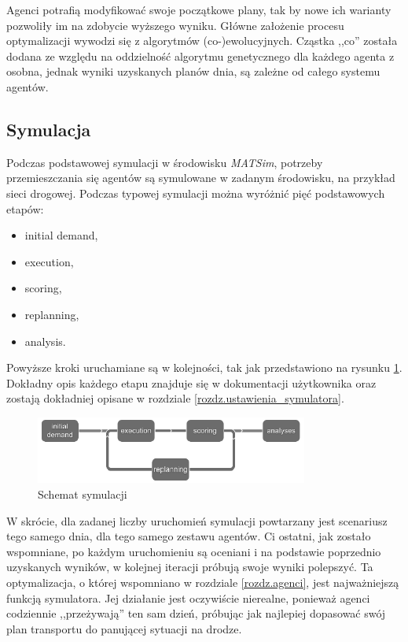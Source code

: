 \documentclass[twoside,12pt]{report}
\begin{document}
Agenci potrafią modyfikować swoje początkowe plany, tak by nowe ich warianty pozwoliły im na zdobycie wyższego wyniku. Główne założenie procesu optymalizacji wywodzi się z algorytmów (co-)ewolucyjnych. Cząstka ,,co'' została dodana ze względu na oddzielność algorytmu genetycznego dla każdego agenta z osobna, jednak wyniki uzyskanych planów dnia, są zależne od całego systemu agentów. 

\subsection{Symulacja}

Podczas podstawowej symulacji w środowisku \textit{MATSim}, potrzeby przemieszczania się agentów są symulowane w zadanym środowisku, na przykład sieci drogowej. Podczas typowej symulacji można wyróżnić pięć podstawowych etapów:

\begin{itemize}
\item initial demand,
\item execution,
\item scoring,
\item replanning,
\item analysis.
\end{itemize}

Powyższe kroki uruchamiane są w kolejności, tak jak przedstawiono na rysunku \ref{fig:schemat_symulacji}. Dokładny opis każdego etapu znajduje się w dokumentacji użytkownika \cite{matsim userg} oraz zostają dokładniej opisane w rozdziale \ref{rozdz.ustawienia_symulatora}.

\begin{figure}[ht]
	\centering
	\includegraphics[width=0.8\textwidth]{img/simulation_stages}
	\caption{Schemat symulacji}
	\label{fig:schemat_symulacji}
\end{figure}

W skrócie, dla zadanej liczby uruchomień symulacji powtarzany jest scenariusz tego samego dnia, dla tego samego zestawu agentów. Ci ostatni, jak zostało wspomniane, po każdym uruchomieniu są oceniani i na podstawie poprzednio uzyskanych wyników, w kolejnej iteracji próbują swoje wyniki polepszyć. Ta optymalizacja, o której wspomniano w rozdziale \ref{rozdz.agenci}, jest najważniejszą funkcją symulatora. Jej działanie jest oczywiście nierealne, ponieważ agenci codziennie ,,przeżywają'' ten sam dzień, próbując jak najlepiej dopasować swój plan transportu do panującej sytuacji na drodze.
\end{document}
